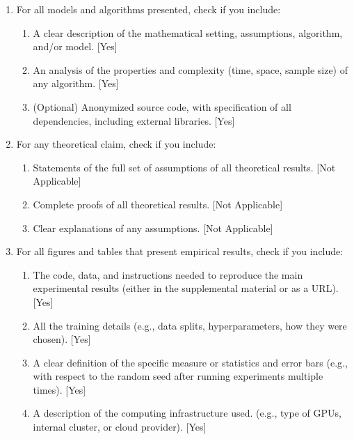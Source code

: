 \documentclass[twoside]{article}
\begin{document}
 \begin{enumerate}

 \item For all models and algorithms presented, check if you include:
 \begin{enumerate}
   \item A clear description of the mathematical setting, assumptions, algorithm, and/or model. [Yes]
   \item An analysis of the properties and complexity (time, space, sample size) of any algorithm. [Yes]
   \item (Optional) Anonymized source code, with specification of all dependencies, including external libraries. [Yes]
 \end{enumerate}

 \item For any theoretical claim, check if you include:
 \begin{enumerate}
   \item Statements of the full set of assumptions of all theoretical results. [Not Applicable]
   \item Complete proofs of all theoretical results. [Not Applicable]
   \item Clear explanations of any assumptions. [Not Applicable]
 \end{enumerate}

 \item For all figures and tables that present empirical results, check if you include:
 \begin{enumerate}
   \item The code, data, and instructions needed to reproduce the main experimental results (either in the supplemental material or as a URL). [Yes]
   \item All the training details (e.g., data splits, hyperparameters, how they were chosen). [Yes]
   \item A clear definition of the specific measure or statistics and error bars (e.g., with respect to the random seed after running experiments multiple times). [Yes]
   \item A description of the computing infrastructure used. (e.g., type of GPUs, internal cluster, or cloud provider). [Yes]
 \end{enumerate}


\end{enumerate}
\end{document}
